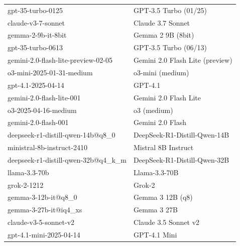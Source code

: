 \documentclass[11pt]{article}
\begin{document}
\begin{table}[htbp]
{\begin{tabular}{ll}
gpt-35-turbo-0125 & GPT-3.5 Turbo (01/25) \\
claude-v3-7-sonnet & Claude 3.7 Sonnet \\
gemma-2-9b-it-8bit & Gemma 2 9B (8bit) \\
gpt-35-turbo-0613 & GPT-3.5 Turbo (06/13) \\
gemini-2.0-flash-lite-preview-02-05 & Gemini 2.0 Flash Lite (preview) \\
o3-mini-2025-01-31-medium & o3-mini (medium) \\
gpt-4.1-2025-04-14 & GPT-4.1 \\
gemini-2.0-flash-lite-001 & Gemini 2.0 Flash Lite \\
o3-2025-04-16-medium & o3 (medium) \\
gemini-2.0-flash-001 & Gemini 2.0 Flash \\
deepseek-r1-distill-qwen-14b@q8\_0 & DeepSeek-R1-Distill-Qwen-14B \\
ministral-8b-instruct-2410 & Mistral 8B Instruct \\
deepseek-r1-distill-qwen-32b@q4\_k\_m & DeepSeek-R1-Distill-Qwen-32B \\
llama-3.3-70b & Llama-3.3-70B \\
grok-2-1212 & Grok-2 \\
gemma-3-12b-it@q8\_0 & Gemma 3 12B (q8) \\
gemma-3-27b-it@iq4\_xs & Gemma 3 27B \\
claude-v3-5-sonnet-v2 & Claude 3.5 Sonnet v2 \\
gpt-4.1-mini-2025-04-14 & GPT-4.1 Mini \\
\bottomrule
\end{tabular}
}
\end{table}
\end{document}
